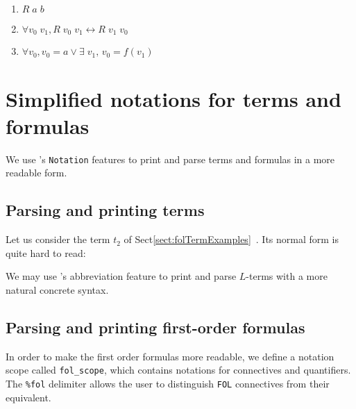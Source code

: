 \label{fol:examplesf1f2f3}
\begin{enumerate}
\item $R\;a\;b$
\item $\forall v_0\; v_1, R\;v_0\;v_1 \leftrightarrow R\;v_1\;v_0$
\item $ \forall v_0, v_0=a \vee \exists\;v_1,\, v_0= f(v_1)$
\end{enumerate}

\label{sect:folFormExamples}



\section{Simplified notations for terms and formulas}
\label{sect:fol-notations}



 We use \coq's \texttt{Notation} features to print and parse terms and formulas  in a more readable form.

 \subsection{Parsing and printing terms}
 \label{sec:fol-term-notations}

Let us consider the term $t_2$ of Sect\ref{sect:folTermExamples}~. Its normal form is quite hard to read:


We may use \coq's abbreviation feature  to print and parse $L$-terms with a more natural concrete syntax.






\subsection{Parsing and printing first-order formulas}

In order to make the first order formulas more readable, we define  a  notation scope called \texttt{fol\_scope}, which contains 
notations for connectives and quantifiers. The \texttt{\%fol} delimiter 
allows the user to distinguish \texttt{FOL} connectives from their \coq equivalent.


\vspace{6pt}

